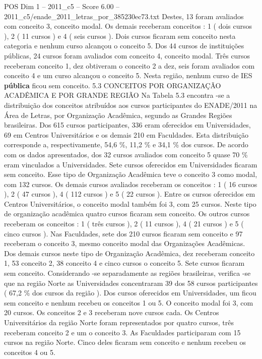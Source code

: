 \begin{textsample}{POS Dim 1 – 2011\_c5 – Score 6.00 – 2011\_c5/enade\_2011\_letras\_por\_385230ec73.txt}
Destes, 13 foram avaliados com conceito 3, conceito modal.
Os demais receberam conceitos : 1 ( dois cursos ), 2 ( 11 cursos ) e 4 ( seis cursos ).
Dois cursos ficaram sem conceito nesta categoria e nenhum curso alcançou o conceito 5.
Dos 44 cursos de instituições públicas, 24 cursos foram avaliados com conceito 4, conceito modal.
Três cursos receberam conceito 1, dez obtiveram o conceito 2 a dez, seis foram avaliados com conceito 4 e um curso alcançou o conceito 5.
Nesta região, nenhum curso de IES \textbf{pública} ficou sem conceito. 5.3 CONCEITOS POR ORGANIZAÇÃO ACADÊMICA E POR GRANDE REGIÃO Na Tabela 5.3 encontra -se a distribuição dos conceitos atribuídos aos cursos participantes do ENADE/2011 na Área de Letras, por Organização Acadêmica, segundo as Grandes Regiões brasileiras.
Dos 615 cursos participantes, 336 eram oferecidos em Universidades, 69 em Centros Universitários e os demais 210 em Faculdades.
Esta distribuição corresponde a, respectivamente, 54,6 \%, 11,2 \% e 34,1 \% dos cursos.
De acordo com os dados apresentados, dos 32 cursos avaliados com conceito 5 quase 70 \% eram vinculados a Universidades.
Sete cursos oferecidos em Universidades ficaram sem conceito.
Esse tipo de Organização Acadêmica teve o conceito 3 como modal, com 132 cursos.
Os demais cursos avaliados receberam os conceitos : 1 ( 16 cursos ), 2 ( 47 cursos ), 4 ( 112 cursos ) e 5 ( 22 cursos ).
Entre os cursos oferecidos em Centros Universitários, o conceito modal também foi 3, com 25 cursos.
Neste tipo de organização acadêmica quatro cursos ficaram sem conceito.
Os outros cursos receberam os conceitos : 1 ( três cursos ), 2 ( 11 cursos ), 4 ( 21 cursos ) e 5 ( cinco cursos ).
Nas Faculdades, sete dos 210 cursos ficaram sem conceito e 97 receberam o conceito 3, mesmo conceito modal das Organizações Acadêmicas.
Dos demais cursos neste tipo de Organização Acadêmica, dez receberam conceito 1, 53 conceito 2, 38 conceito 4 e cinco cursos o conceito 5.
Sete cursos ficaram sem conceito.
Considerando -se separadamente as regiões brasileiras, verifica -se que na região Norte as Universidades concentraram 39 dos 58 cursos participantes ( 67,2 \% dos cursos da região ).
Dos cursos oferecidos em Universidades, um ficou sem conceito e nenhum recebeu os conceitos 1 ou 5.
O conceito modal foi 3, com 20 cursos.
Os conceitos 2 e 3 receberam nove cursos cada.
Os Centros Universitários da região Norte foram representados por quatro cursos, três receberam conceito 2 e um o conceito 3.
As Faculdades participaram com 15 cursos na região Norte.
Cinco deles ficaram sem conceito e nenhum recebeu os conceitos 4 ou 5.

\end{textsample}
